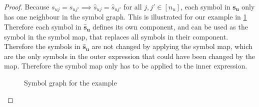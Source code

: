 \begin{proof}
    \small
    Because $s_{uj} = s_{uj'} \implies \hat{s}_{uj} = \hat{s}_{uj'}$ for all $j, j' \in [n_u]$,
    each symbol in $\bm{s_u}$ only has one neighbour in the symbol graph.
    This is illustrated for our example in \cref{fig:nested_expressions:example_symbol_graph_intro}
    Therefore each symbol in $\bm{\hat{s}_u}$ defines its own component,
    and can be used as the symbol in the symbol map, that replaces all symbols in their component.
    Therefore the symbols in $\bm{\hat{s}_u}$ are not changed by applying the symbol map, which are the only symbols in the outer expression that could have been changed by the map.
    Therefore the symbol map only has to be applied to the inner expression.

    \begin{figure}[h]
        \centering
        \caption{Symbol graph for the example}
        \label{fig:nested_expressions:example_symbol_graph_intro}
    \end{figure}
\end{proof}
\bigskip